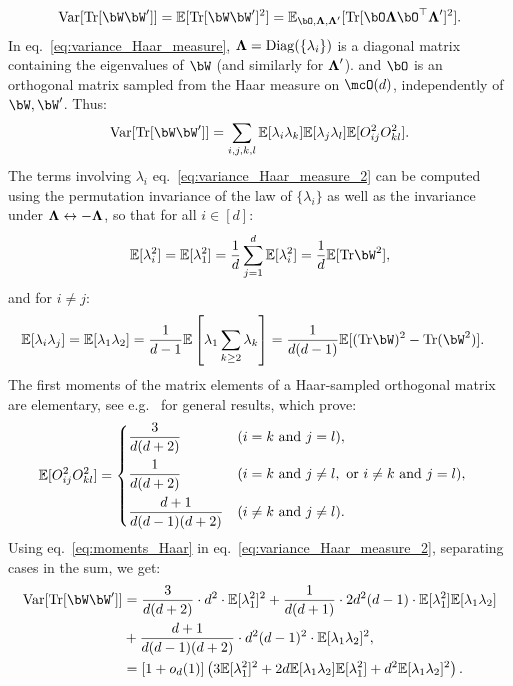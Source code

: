 \begin{align}\label{eq:variance_Haar_measure}
   \textrm{Var}[\Tr[\bW \bW']] = \EE[\Tr[\bW \bW']^2]= \EE_{\bO, \bLambda, \bLambda'}[\Tr[\bO \bLambda \bO^\T \bLambda']^2].
\end{align}
In eq.~\eqref{eq:variance_Haar_measure}, ${\boldsymbol{\Lambda}} = \mathrm{Diag}(\{\lambda_i\})$ is a diagonal matrix containing the eigenvalues of $\bW$ (and similarly for ${\boldsymbol{\Lambda}}'$). 
and $\bO$ is an orthogonal matrix sampled from the Haar measure on $\mcO(d)$, independently of $\bW, \bW'$.
Thus:
\begin{align}\label{eq:variance_Haar_measure_2}
   \textrm{Var}[\Tr[\bW \bW']] = \sum_{i,j,k,l} \EE[\lambda_i \lambda_k] \EE[\lambda_j \lambda_l] \EE[O_{ij}^2 O_{kl}^2].
\end{align}
The terms involving $\lambda_i$ eq.~\eqref{eq:variance_Haar_measure_2} can be computed using the permutation invariance of the law of $\{\lambda_i\}$ as well as the invariance under ${\boldsymbol{\Lambda}} \leftrightarrow - {\boldsymbol{\Lambda}}$, so that 
for all $i \in [d]$:
\begin{align}\label{eq:EE_lambdai2}
    \EE[\lambda_i^2] = \EE[\lambda_1^2] = \frac{1}{d} \sum_{j=1}^d \EE[\lambda_i^2] = \frac{1}{d} \EE[\Tr \bW^2],
\end{align}
and for $i \neq j$:
\begin{align}\label{eq:EE_lambdailambdaj}
    \EE[\lambda_i \lambda_j] &= \EE[\lambda_1 \lambda_2] = \frac{1}{d-1} \EE\left[\lambda_1 \sum_{k \geq 2} \lambda_k\right]
    = \frac{1}{d(d-1)} \EE[(\Tr \bW)^2 - \Tr(\bW^2)].
\end{align}
The first moments of the matrix elements of a Haar-sampled orthogonal matrix are elementary, see e.g.\ \cite{banica2011polynomial} for general results, 
which prove: 
\begin{align}\label{eq:moments_Haar}
    \mathbb{E}[O_{ij}^2 O_{kl}^2] &= \begin{dcases}
        \frac{3}{d(d+2)} &(i = k \textrm{ and } j = l), \\
        \frac{1}{d(d+2)} &(i = k \textrm{ and } j \neq l, \textrm{ or } i \neq k \textrm{ and } j = l), \\
        \frac{d+1}{d(d-1)(d+2)} &(i \neq k \textrm{ and } j \neq l).
    \end{dcases}
\end{align}
Using eq.~\eqref{eq:moments_Haar} in eq.~\eqref{eq:variance_Haar_measure_2}, separating 
cases in the sum, we get:
\begin{align}\label{eq:variance_Haar_measure_3}
    \nonumber
   \textrm{Var}[\Tr[\bW \bW']] &= 
   \frac{3}{d(d+2)} \cdot d^2 \cdot \EE[\lambda_1^2]^2 + 
   \frac{1}{d(d+1)} \cdot 2 d^2 (d-1) \cdot \EE[\lambda_1^2] \EE[\lambda_1 \lambda_2] \\ 
    \nonumber
   &+ \frac{d+1}{d(d-1)(d+2)} \cdot d^2(d-1)^2 \cdot \EE[\lambda_1 \lambda_2]^2, \\ 
   &= [1 +\smallO_d(1)] \left(3\EE[\lambda_1^2]^2 + 2d \EE[\lambda_1 \lambda_2] \EE[\lambda_1^2] + d^2 \EE[\lambda_1 \lambda_2]^2 \right).
\end{align}
